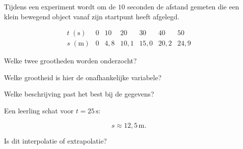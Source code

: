 \documentclass{ximera}
\begin{document}


\begin{oefening}{\oefU \ESS}

Tijdens een experiment wordt om de $10$ seconden de afstand gemeten
die een klein bewegend object vanaf zijn startpunt heeft afgelegd.

\[
\begin{array}{c|cccccc}
t\;(\mathrm s)
&0&10&20&30&40&50\\ \hline
s\;(\mathrm m)
&0&4{,}8&10{,}1&15{,}0&20{,}2&24{,}9
\end{array}
\]

\begin{question}
Welke twee grootheden worden onderzocht?

\begin{multipleChoice}
\end{multipleChoice}
\end{question}

\begin{question}
Welke grootheid is hier de onafhankelijke variabele?

\begin{multipleChoice}
\end{multipleChoice}
\end{question}

\begin{question}
Welke beschrijving past het best bij de gegevens?

\begin{multipleChoice}
\end{multipleChoice}
\end{question}

\begin{question}
Een leerling schat voor $t=25\,\mathrm s$:

\[
s\approx12{,}5\,\mathrm m.
\]

Is dit interpolatie of extrapolatie?

\begin{multipleChoice}
\end{multipleChoice}
\end{question}


\end{oefening}
\end{document}
